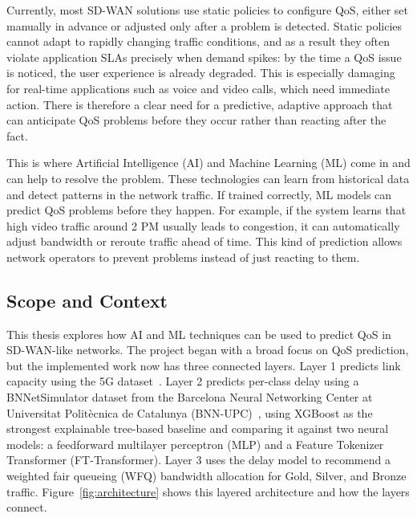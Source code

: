\documentclass[a4paper,12pt]{Classes/RoboticsLaTeX}
\begin{document}
    Currently, most SD-WAN solutions use static policies to configure QoS, either set manually in advance or adjusted only after a problem is detected. Static policies cannot adapt to rapidly changing traffic conditions, and as a result they often violate application SLAs precisely when demand spikes: by the time a QoS issue is noticed, the user experience is already degraded. This is especially damaging for real-time applications such as voice and video calls, which need immediate action. There is therefore a clear need for a predictive, adaptive approach that can anticipate QoS problems before they occur rather than reacting after the fact.
    
    This is where Artificial Intelligence (AI) and Machine Learning (ML) come in and can help to resolve the problem. These technologies can learn from historical data and detect patterns in the network traffic. If trained correctly, ML models can predict QoS problems before they happen. For example, if the system learns that high video traffic around 2 PM usually leads to congestion, it can automatically adjust bandwidth or reroute traffic ahead of time. This kind of prediction allows network operators to prevent problems instead of just reacting to them.  
    
    \subsection*{Scope and Context}
    
    This thesis explores how AI and ML techniques can be used to predict QoS in SD-WAN-like networks. The project began with a broad focus on QoS prediction, but the implemented work now has three connected layers. Layer 1 predicts link capacity using the 5G dataset~\cite{raffeck2024zenodo}. Layer 2 predicts per-class delay using a BNNetSimulator dataset from the Barcelona Neural Networking Center at Universitat Politècnica de Catalunya (BNN-UPC)~\cite{ferriolgalmes2022routenetfermi}, using XGBoost as the strongest explainable tree-based baseline and comparing it against two neural models: a feedforward multilayer perceptron (MLP) and a Feature Tokenizer Transformer (FT-Transformer). Layer 3 uses the delay model to recommend a weighted fair queueing (WFQ) bandwidth allocation for Gold, Silver, and Bronze traffic. Figure~\ref{fig:architecture} shows this layered architecture and how the layers connect.
\end{document}
